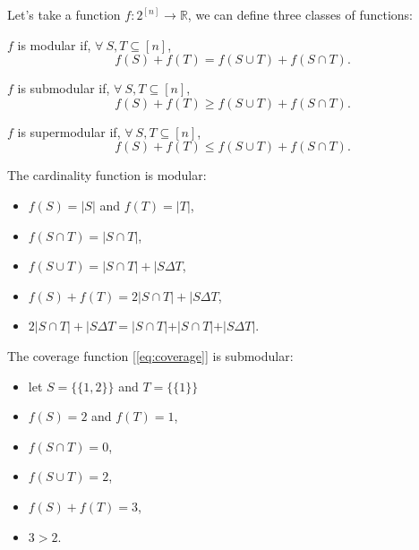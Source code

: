 Let's take a function $f: 2^{[n]} \to \mathbb{R}$, we can define three classes of functions:
\begin{defn}\label{def:submodular}
    $f$ is modular if, $\forall\ S, T \subseteq [n]$,
    \begin{equation}\label{eq:modular}
        f(S) + f(T) = f(S \cup T) + f(S \cap T).
    \end{equation}
\end{defn}
\begin{defn}\label{def:modular}
    $f$ is submodular if, $\forall\ S, T \subseteq [n]$,
    \begin{equation}\label{eq:submodular}
        f(S) + f(T) \geq f(S \cup T) + f(S \cap T).
    \end{equation}
\end{defn}
\begin{defn}\label{def:supermodular}
    $f$ is supermodular if, $\forall\ S, T \subseteq [n]$,
    \begin{equation}\label{eq:supermodular}
        f(S) + f(T) \leq f(S \cup T) + f(S \cap T).
    \end{equation}
\end{defn}

\begin{ex}
    The cardinality function is modular:
    \begin{itemize}
        \item $f(S)=|S|$ and $f(T)=|T|$,
        \item $f(S \cap T) = |S \cap T|$,
        \item $f(S \cup T) = |S \cap T| + |S \Delta T$,
        \item $f(S) + f(T) = 2 |S \cap T| + |S \Delta T$,
        \item $2 |S \cap T| + |S \Delta T = |S \cap T| + |S \cap T| + |S \Delta T|$.
    \end{itemize}    
\end{ex}

\begin{ex}
    The coverage function [\ref{eq:coverage}] is submodular:
    \begin{itemize}
        \item let $S=\{\{1,2\}\}$ and $T = \{\{1\}\}$
        \item $f(S)=2$ and $f(T)=1$,
        \item $f(S \cap T) = 0$,
        \item $f(S \cup T) = 2$,
        \item $f(S) + f(T) = 3$,
        \item $3 > 2$.
    \end{itemize}    
\end{ex}

